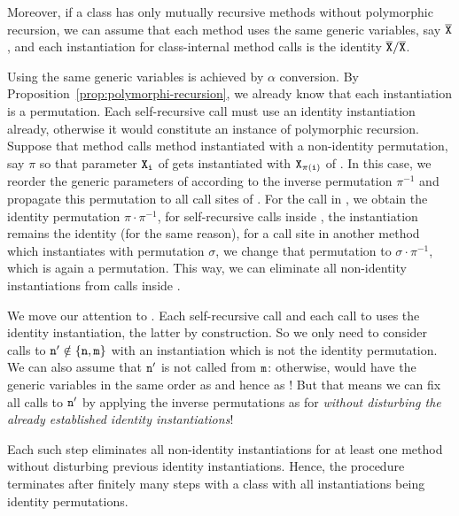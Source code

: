 Moreover, if a class has only mutually recursive methods without
polymorphic recursion, we can assume that each method uses the same
generic variables, say $\overline{\tt X}$, and each instantiation for
class-internal method calls is the identity $\overline{\tt X}/\overline{\tt X}$.

Using the same generic variables is achieved by $\alpha$ conversion.
By Proposition~\ref{prop:polymorphi-recursion}, we already know that
each instantiation is a permutation. Each self-recursive call must use
an identity instantiation already, otherwise it would constitute an
instance of polymorphic recursion. Suppose that method  calls
method  instantiated with a non-identity permutation, say
$\pi$ so that parameter ${\tt X_i}$ of  gets instantiated with
${\tt X_{\pi(i)}}$ of . In this case, we reorder the generic
parameters of   according to the inverse permutation
$\pi^{-1}$ and propagate this permutation to all call sites of
. For the call in , we obtain the identity permutation
$\pi \cdot \pi^{-1}$, for self-recursive calls inside , the
instantiation remains the identity (for the same reason), for a
call site in another method which instantiates  with permutation
$\sigma$, we change that permutation to $\sigma \cdot \pi^{-1}$, which
is again a permutation.
This way, we can eliminate all non-identity instantiations from calls
inside .

We move our attention to . Each self-recursive call and each call to  uses the
identity instantiation, the latter by construction. So we only need to
consider calls to ${\tt n'}\notin\{{\tt n}, {\tt m}\}$ with an
instantiation which is not the identity permutation. We can also
assume that ${\tt n'}$ is not called from ${\tt m}$: otherwise, 
would have the generic variables in the same order as  and hence
as ! But that means we can fix all calls to ${\tt n'}$ by
applying the inverse permutations as for  \emph{without disturbing the already
  established identity instantiations}!

Each such step eliminates all non-identity instantiations for at least
one method without disturbing previous identity instantiations. Hence,
the procedure terminates after finitely many steps with a class with
all instantiations being identity permutations.


